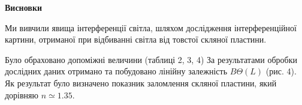\begin{center}        
    \Large{\textbf{Висновки}}    
\end{center}

\vspace{1mm}

Ми вивчили 
явища інтерференції світла, шляхом дослідження інтерференційної картини,
отриманої при відбиванні світла від товстої скляної пластини.

Було обраховано допоміжні величини (таблиці 2, 3, 4)
За результатами обробки дослідних даних отримано та побудовано лінійну залежність $B \Theta(L)$ (рис. 4).
Як результат було визначено показник заломлення скляної пластини, який дорівняю $n \simeq 1.35$.

